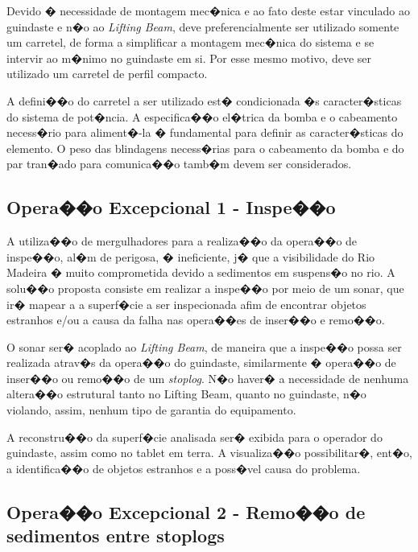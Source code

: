 Devido � necessidade de montagem mec�nica e ao fato deste estar vinculado ao guindaste e n�o ao \textit{Lifting Beam}, deve preferencialmente ser utilizado somente um carretel, de forma a simplificar a montagem mec�nica do sistema e se intervir ao m�nimo no guindaste em si. Por esse mesmo motivo, deve ser utilizado um carretel de perfil compacto.
 
A defini��o do carretel a ser utilizado est� condicionada �s caracter�sticas do sistema de pot�ncia. A especifica��o el�trica da bomba e o cabeamento necess�rio para aliment�-la � fundamental para definir as caracter�sticas do elemento. O peso das blindagens necess�rias para o cabeamento da bomba e do par tran�ado para comunica��o tamb�m devem ser considerados.

\subsection{Opera��o Excepcional 1 - Inspe��o}
A utiliza��o de mergulhadores para a realiza��o da opera��o de inspe��o, al�m de perigosa, � ineficiente, j� que a visibilidade do Rio Madeira � muito comprometida devido a sedimentos em suspens�o no rio. A solu��o proposta consiste em realizar a inspe��o por meio de um sonar, que ir� mapear a a superf�cie a ser inspecionada afim de encontrar objetos estranhos e/ou a causa da falha nas opera��es de inser��o e remo��o.

O sonar ser� acoplado ao \emph{Lifting Beam}, de maneira que a inspe��o possa ser realizada atrav�s da opera��o do guindaste, similarmente � opera��o de inser��o ou remo��o de um \emph{stoplog}. N�o haver� a necessidade de nenhuma altera��o estrutural tanto no Lifting Beam, quanto no guindaste, n�o violando, assim, nenhum tipo de garantia do equipamento.

A reconstru��o da superf�cie analisada ser� exibida para o operador do guindaste, assim como no tablet em terra. A visualiza��o possibilitar�, ent�o, a identifica��o de objetos estranhos e a poss�vel causa do problema.

\subsection{Opera��o Excepcional 2 - Remo��o de sedimentos entre stoplogs}

